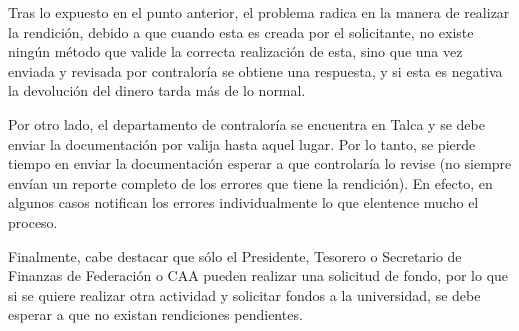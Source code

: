 Tras lo expuesto en el punto anterior, el problema radica en la manera de realizar la rendición, debido a que cuando esta es creada por el solicitante, no existe ningún método que valide la correcta realización de esta, sino que una vez enviada y revisada por contraloría se obtiene una respuesta, y si esta es negativa la devolución del dinero tarda más de lo normal.

Por otro lado, el departamento de contraloría se encuentra en Talca y se debe enviar la documentación por valija hasta aquel lugar. Por lo tanto, se pierde tiempo en enviar la documentación esperar a que controlaría lo revise (no siempre envían un reporte completo de los errores que tiene la rendición). En efecto, en algunos casos notifican los errores individualmente lo que elentence mucho el proceso.

Finalmente, cabe destacar que sólo el Presidente, Tesorero o Secretario de Finanzas de Federación o CAA pueden realizar una solicitud de fondo, por lo que si se quiere realizar otra actividad y solicitar fondos a la universidad, se debe esperar a que no existan rendiciones pendientes.